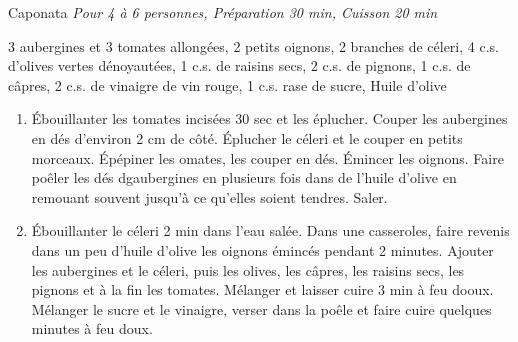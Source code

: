 \begin{recette}{Caponata}
  \emph{Pour 4 à 6 personnes, Préparation 30 min, Cuisson 20 min}
	\begin{ingredients}
  3 aubergines et 3 tomates allongées\sep
  2 petits oignons\sep
  2 branches de céleri\sep
  4 c.s. d’olives vertes dénoyautées\sep
  1 c.s. de raisins secs\sep
  2 c.s. de pignons\sep
  1 c.s. de câpres\sep
  2 c.s. de vinaigre de vin rouge\sep
  1 c.s. rase de sucre\sep
  Huile d’olive
  \end{ingredients}
	\begin{enumerate}
	\item Ébouillanter les tomates incisées 30 sec et les éplucher. Couper les aubergines en dés d’environ 2 cm de côté. Éplucher le céleri et le couper en petits morceaux. Épépiner les omates, les couper en dés. Émincer les oignons. Faire poêler les dés dgaubergines en plusieurs fois dans de l’huile d’olive en remouant souvent jusqu’à ce qu’elles soient tendres. Saler.
  \item Ébouillanter le céleri 2 min dans l’eau salée. Dans une casseroles, faire revenis dans un peu d’huile d’olive les oignons émincés pendant 2 minutes. Ajouter les aubergines et le céleri, puis les olives, les câpres, les raisins secs, les pignons et à la fin les tomates. Mélanger et laisser cuire 3 min à feu dooux. Mélanger le sucre et le vinaigre, verser dans la poêle et faire cuire quelques minutes à feu doux.
  \end{enumerate}
\end{recette}
